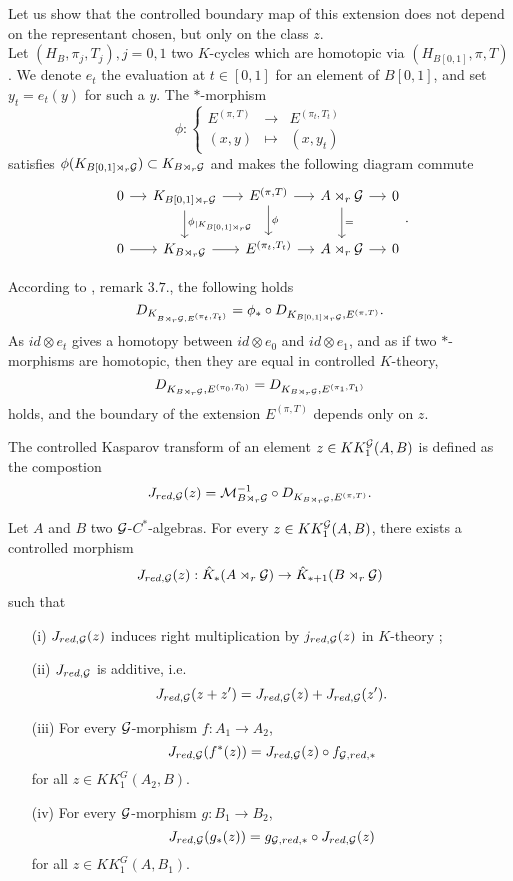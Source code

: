 Let us show that the controlled boundary map of this extension does not depend on the representant chosen, but only on the class $z$.\\
Let $(H_B, \pi_j,T_j), j=0,1$ two $K$-cycles which are homotopic via $(H_{B[0,1]},\pi,T)$. We denote $e_t$ the evaluation at $t\in[0,1]$ for an element of $B[0,1]$, and set $y_t=e_t(y)$ for such a $y$. The $*$-morphism
\[\phi : \left\{\begin{array}{lll}E^{(\pi,T)} & \rightarrow & E^{(\pi_t,T_t)} \\ (x,y) & \mapsto & (x, y_t)\end{array}\right.\]
satisfies $\phi(K_{B[0,1] \rtimes_r \mathcal G})\subset K_{B \rtimes_r \mathcal G}$ and makes the following diagram commute
\[\begin{tikzcd}[column sep = small]
0\arrow{r} & K_{B[0,1] \rtimes_r \G}\arrow{r}\arrow{d}{\phi_{|K_{B[0,1] \rtimes_r \G}}} & E^{(\pi,T)} \arrow{r}\arrow{d}{\phi} & A\rtimes_r \G \arrow{r}\arrow{d}{=}& 0 \\
0\arrow{r} & K_{B \rtimes_r \G}\arrow{r} &  E^{(\pi_t,T_t)} \arrow{r} & A\rtimes_r \G \arrow{r} & 0
\end{tikzcd}.\]

According to \cite{OY2}, remark $3.7.$, the following holds
\[D_{K_{B\rtimes_r\mathcal G,E^{(\pi_t,T_t)}}} = \phi_* \circ D_{K_{B[0,1]\rtimes_r\mathcal G},E^{(\pi,T)}}.\]
As $id \otimes e_t$ gives a homotopy between $id\otimes e_0$ and $id\otimes e_1$, and as if two $*$-morphisms are homotopic, then they are equal in controlled $K$-theory, 
\[D_{K_{B\rtimes_r \mathcal G}, E^{(\pi_0,T_0)}}=D_{K_{B\rtimes_r \mathcal G}, E^{(\pi_1,T_1)}}\]
holds, and the boundary of the extension $E^{(\pi,T)}$ depends only on $z$.\\

\begin{definition}
The controlled Kasparov transform of an element $z\in KK_1^\mathcal G(A,B)$ is defined as the compostion
\[J_{red,\mathcal G}(z)=\mathcal M_{B\rtimes_r \mathcal G}^{-1}\circ D_{K_{B\rtimes_r \mathcal G}, E^{(\pi,T)}}.\]
\end{definition}

\begin{prop}
Let $A$ and $B$ two $\mathcal G$-$C^*$-algebras. For every $z\in KK^\mathcal G_1(A,B)$, there exists a controlled morphism
\[J_{red,\mathcal G}(z) : \hat K_*(A\rtimes_r \mathcal G)\rightarrow \hat K_{*+1}(B\rtimes_r \mathcal G)\]
such that
\begin{enumerate}
\item[(i)] $J_{red,\mathcal G}(z)$ induces right multiplication by $j_{red,\mathcal G}(z)$ in $K$-theory ;
\item[(ii)] $J_{red,\mathcal G}$ is additive, i.e.
\[J_{red,\mathcal G}(z+z')=J_{red,\mathcal G}(z)+J_{red,\mathcal G}(z').\]
\item[(iii)] For every $\mathcal G$-morphism $f : A_1\rightarrow A_2$,
\[J_{red,\mathcal G}(f^*(z))=J_{red,\mathcal G}(z)\circ f_{\mathcal G,red,*}\] for all $z\in KK_1^G(A_2,B)$.
\item[(iv)] For every $\mathcal G$-morphism $g : B_1\rightarrow B_2$,
\[J_{red,\mathcal G}(g_*(z))= g_{\mathcal G,red,*}\circ J_{red,\mathcal G}(z)\] for all $z\in KK_1^G(A,B_1)$.
\end{enumerate}
\end{prop}

